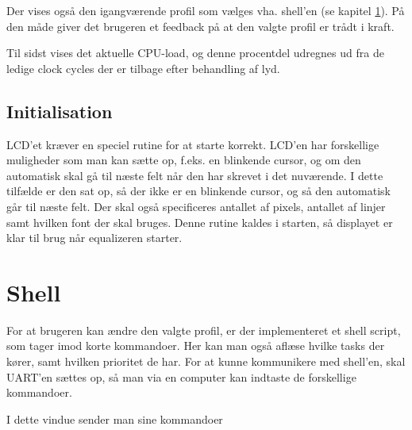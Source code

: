 
Der vises også den igangværende profil som vælges vha. shell'en (se kapitel \ref{sec:shell}). På den måde giver det brugeren et feedback på at den valgte profil er trådt i kraft. 

Til sidst vises det aktuelle CPU-load, og denne procentdel udregnes ud fra de ledige clock cycles der er tilbage efter behandling af lyd. 

\subsection{Initialisation}
LCD'et kræver en speciel rutine for at starte korrekt. LCD'en har forskellige muligheder som man kan sætte op, f.eks. en blinkende cursor, og om den automatisk skal gå til næste felt når den har skrevet i det nuværende. I dette tilfælde er den sat op, så der ikke er en blinkende cursor, og så den automatisk går til næste felt. Der skal også specificeres antallet af pixels, antallet af linjer samt hvilken font der skal bruges. Denne rutine kaldes i starten, så displayet er klar til brug når equalizeren starter. 

\section{Shell}\label{sec:shell}
For at brugeren kan ændre den valgte profil, er der implementeret et shell script, som tager imod korte kommandoer. Her kan man også aflæse hvilke tasks der kører, samt hvilken prioritet de har. For at kunne kommunikere med shell'en, skal UART'en sættes op, så man via en computer kan indtaste de forskellige kommandoer. 


I dette vindue sender man sine kommandoer 


